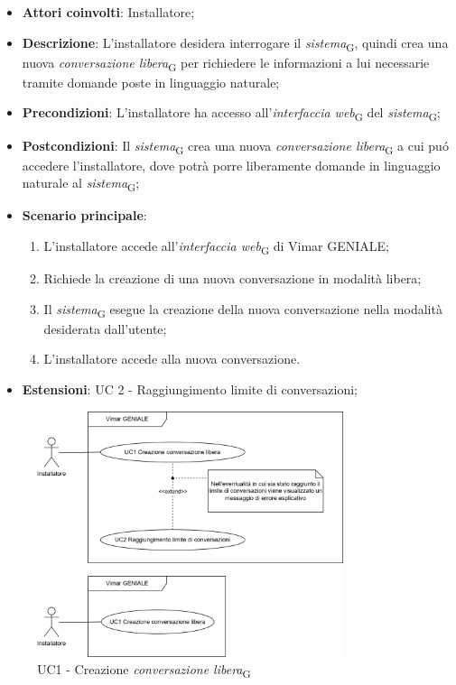 
\begin{itemize}
    \item \textbf{Attori coinvolti}: Installatore;
    \item \textbf{Descrizione}: L’installatore desidera interrogare il \textit{sistema}\textsubscript{G}, quindi crea una nuova \textit{conversazione libera}\textsubscript{G} per richiedere le informazioni a lui necessarie tramite domande poste in linguaggio naturale;
    \item \textbf{Precondizioni}: L’installatore ha accesso all’\textit{interfaccia web}\textsubscript{G} del \textit{sistema}\textsubscript{G};
    \item \textbf{Postcondizioni}: Il \textit{sistema}\textsubscript{G} crea una nuova \textit{conversazione libera}\textsubscript{G} a cui puó accedere l’installatore, dove potrà porre liberamente domande in linguaggio naturale al \textit{sistema}\textsubscript{G};
    \item \textbf{Scenario principale}:
    \begin{enumerate}
    \item L’installatore accede all’\textit{interfaccia web}\textsubscript{G} di Vimar GENIALE;
    \item Richiede la creazione di una nuova conversazione in modalità libera;
    \item Il \textit{sistema}\textsubscript{G} esegue la creazione della nuova conversazione nella modalità desiderata dall’utente;
    \item  L’installatore accede alla nuova conversazione.
    \end{enumerate}
    \item \textbf{Estensioni}: UC 2 - Raggiungimento limite di conversazioni;
\end{itemize}
\begin{figure}[H]
\centering
\includegraphics[width=0.8\textwidth]{contents/casi_duso/png/UC1.png}
\caption{UC1 - Creazione \textit{conversazione libera}\textsubscript{G}}
\end{figure}

